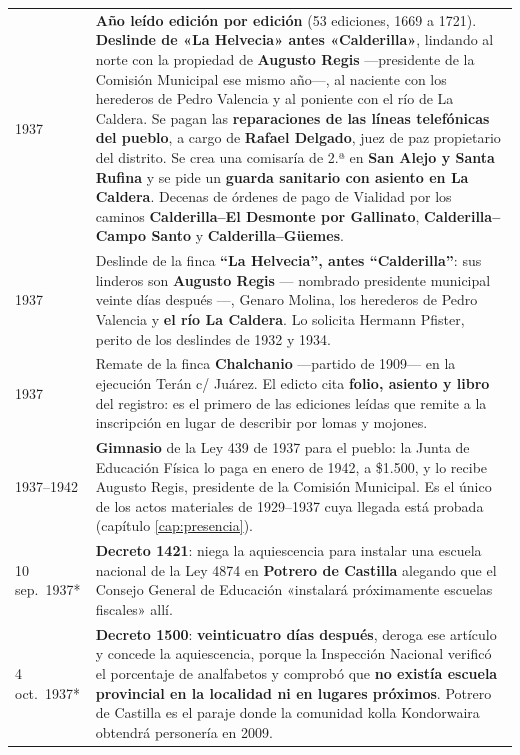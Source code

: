 \begin{longtable}{@{}p{2.7cm}p{10.3cm}@{}}
1937 & \textbf{Año leído edición por edición} (53 ediciones, 1669 a 1721). \textbf{Deslinde de «La Helvecia» antes «Calderilla»}, lindando al norte con la propiedad de \textbf{Augusto Regis}\index{Regis, Augusto} ---presidente de la Comisión Municipal ese mismo año---, al naciente con los herederos de Pedro Valencia y al poniente con el río de La Caldera. Se pagan las \textbf{reparaciones de las líneas telefónicas del pueblo}, a cargo de \textbf{Rafael Delgado}, juez de paz propietario del distrito. Se crea una comisaría de 2.ª en \textbf{San Alejo y Santa Rufina} y se pide un \textbf{guarda sanitario con asiento en La Caldera}. Decenas de órdenes de pago de Vialidad por los caminos \textbf{Calderilla--El Desmonte por Gallinato}, \textbf{Calderilla--Campo Santo} y \textbf{Calderilla--Güemes}. \\
1937 & Deslinde de la finca \textbf{``La Helvecia'', antes ``Calderilla''}: sus linderos son \textbf{Augusto Regis\index{Regis, Augusto}} --- nombrado presidente municipal veinte días después ---, Genaro Molina\index{Molina, Genaro}, los herederos de Pedro Valencia y \textbf{el río La Caldera}. Lo solicita Hermann Pfister\index{Pfister, Hermann}, perito de los deslindes de 1932 y 1934. \\
1937 & Remate de la finca \textbf{Chalchanio} —partido de 1909— en la ejecución Terán c/ Juárez. El edicto cita \textbf{folio, asiento y libro} del registro: es el primero de las ediciones leídas que remite a la inscripción en lugar de describir por lomas y mojones. \\
1937--1942 & \textbf{Gimnasio} de la Ley 439 de 1937 para el pueblo: la Junta de Educación Física lo paga en enero de 1942, a \$1.500, y lo recibe Augusto Regis, presidente de la Comisión Municipal. Es el único de los actos materiales de 1929--1937 cuya llegada está probada (capítulo \ref{cap:presencia}). \\
10 sep.\ 1937* & \textbf{Decreto 1421}: niega la aquiescencia para instalar una escuela nacional de la Ley 4874 en \textbf{Potrero de Castilla} alegando que el Consejo General de Educación «instalará próximamente escuelas fiscales» allí. \\
4 oct.\ 1937* & \textbf{Decreto 1500}: \textbf{veinticuatro días después}, deroga ese artículo y concede la aquiescencia, porque la Inspección Nacional verificó el porcentaje de analfabetos y comprobó que \textbf{no existía escuela provincial en la localidad ni en lugares próximos}. Potrero de Castilla es el paraje donde la comunidad kolla Kondorwaira obtendrá personería en 2009. \\

\end{longtable}
